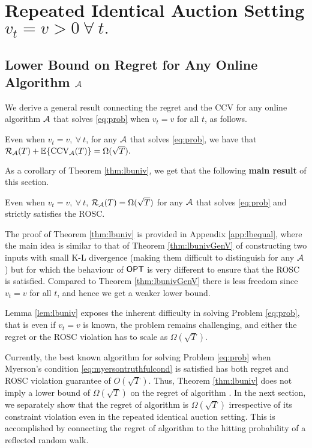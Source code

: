 \section{Repeated Identical Auction Setting $v_t=v  >0\ \forall \ t.$}
\subsection{Lower Bound on Regret for Any Online Algorithm $\mathcal{A}$}
We derive a general result connecting the regret and the $\text{CCV}$ for any online algorithm $\mathcal{A}$ that solves \eqref{eq:prob} when $v_t=v$ for all $t$, as follows.

\begin{theorem}\label{thm:lbuniv}
Even when $v_t=v, \ \forall \ t$, for any  $\mathcal{A}$ that solves \eqref{eq:prob}, we have that 
  $\mathcal{R}_{\mathcal{A}}(T) + {\mathbb{E}}\{\text{CCV}_{\mathcal{A}}(T)\} = \Omega(\sqrt{T}).$
\end{theorem}

As a corollary of Theorem \ref{thm:lbuniv}, we get that the following  {\bf main result} of this section.
\begin{lemma}\label{lem:lbuniv}
Even when $v_t=v, \ \forall \ t$, $\mathcal{R}_{\mathcal{A}}(T)= \Omega(\sqrt{T})$ for any $\mathcal{A}$ that solves \eqref{eq:prob} and strictly satisfies the ROSC.
\end{lemma}
The proof of Theorem \ref{thm:lbuniv} is provided in Appendix \ref{app:lbequal}, where the main idea is similar to that of Theorem \ref{thm:lbunivGenV}
 of constructing two inputs 
with small K-L divergence (making them difficult to distinguish for any $\mathcal{A}$) but for which the behaviour of $\mathsf{OPT}$ is very different to ensure that the 
ROSC is satisfied. Compared to Theorem \ref{thm:lbunivGenV}
 there is less freedom since $v_t=v$ for all $t$, and hence we get a weaker lower bound. 

Lemma \ref{lem:lbuniv} exposes the inherent difficulty in solving Problem \ref{eq:prob}, that is even if $v_t=v$ is known, the problem remains 
challenging, and either the regret or the ROSC violation has to scale as $\Omega(\sqrt{T})$. 

Currently, the best known algorithm \cite{Feng} for solving Problem \eqref{eq:prob} when Myerson's condition \eqref{eq:myersontruthfulcond} is satisfied has both regret and ROSC violation guarantee of $O(\sqrt{T})$. Thus, Theorem \ref{thm:lbuniv} does not imply a lower bound of $\Omega(\sqrt{T})$ on the regret of algorithm \cite{Feng}. In the next section, we separately show that the regret of algorithm \cite{Feng} is $\Omega(\sqrt{T})$ irrespective of its constraint violation even in the repeated identical auction setting. This is accomplished by connecting the regret of algorithm \cite{Feng} to the hitting probability of a reflected random walk. 
